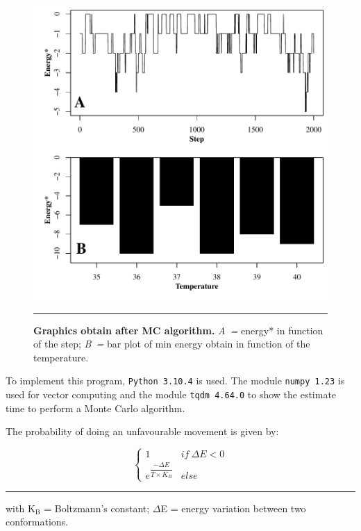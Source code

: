 \documentclass[12pt, oneside, a4paper]{report}
\newcommand{\eqdes}[1]{
    \begin{footnotesize}
        \hrule height 1pt
        #1
    \end{footnotesize}
}
\newcommand{\id}[1]{$_\text{#1}$}
\begin{document}
\begin{multicols}{2}
\begin{figure}[!b!t]
    \includegraphics[width=\textwidth]{figure/energy.pdf}
    
    \small
    \vspace{0.5ex}
    \hrule height 1pt

    \caption{
        \textbf{Graphics obtain after MC algorithm.} \textit{A~=} energy* in function of the step; \textit{B~=} bar plot of min energy obtain in function of the temperature.
        \label{f:energy}}
\end{figure}

To implement this program, \texttt{Python 3.10.4} is used. The module \texttt{numpy 1.23} is used for vector computing and the module \texttt{tqdm 4.64.0} to show the estimate time to perform a Monte Carlo algorithm.

The probability of doing an unfavourable movement is given by:

\vspace{-2ex}

\begin{equation*}
    \left\lbrace
    \begin{array}{ll}
        1                                       & if\:\Delta{} E < 0 \\
        e^{\dfrac{-\Delta{}E}{T \times K_B}}    & else
    \end{array}
    \right.
\end{equation*}
\eqdes{with K\id{B} = Boltzmann's constant; $\Delta{}$E = energy variation between two conformations.}


\end{multicols}
\end{document}
